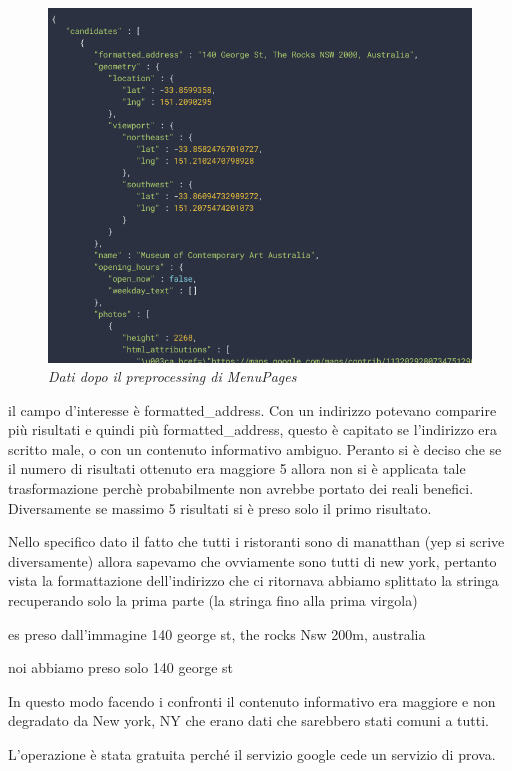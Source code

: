 \documentclass[a4paper,12pt]{article}
\begin{document}
\begin{figure}[H]
	\centering
	\includegraphics[width=0.8\linewidth]{img/img.png}
	\caption{\textit{Dati dopo il preprocessing di MenuPages}}
\end{figure}

il campo d'interesse è formatted\_address. Con un indirizzo potevano comparire più risultati e quindi più formatted\_address, questo è capitato se l'indirizzo era scritto male, o con un contenuto informativo ambiguo. Peranto si è deciso che se il numero di risultati ottenuto era maggiore 5 allora non si è applicata tale trasformazione perchè probabilmente non avrebbe portato dei reali benefici. Diversamente se massimo 5 risultati si è preso solo il primo risultato. 

Nello specifico dato il fatto che tutti i ristoranti sono di manatthan (yep si scrive diversamente) allora sapevamo che ovviamente sono tutti di new york, pertanto vista la formattazione dell'indirizzo che ci ritornava
abbiamo splittato la stringa recuperando solo la prima parte (la stringa fino alla prima virgola)

es preso dall'immagine
140 george st, the rocks Nsw 200m, australia

noi abbiamo preso solo 140 george st

In questo modo facendo i confronti il contenuto informativo era maggiore e non degradato da New york, NY che erano dati che sarebbero stati comuni a tutti.

L'operazione è stata gratuita perché il servizio google cede un servizio di prova.




\newpage
\printbibliography[title=Bibliografia]
\end{document}
